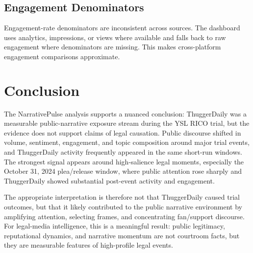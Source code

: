 \documentclass[12pt]{article}
\begin{document}
\subsection{Engagement Denominators}
Engagement-rate denominators are inconsistent across sources. The dashboard uses analytics, impressions, or views where available and falls back to raw engagement where denominators are missing. This makes cross-platform engagement comparisons approximate.

\section{Conclusion}
The NarrativePulse analysis supports a nuanced conclusion: ThuggerDaily was a measurable public-narrative exposure stream during the YSL RICO trial, but the evidence does not support claims of legal causation. Public discourse shifted in volume, sentiment, engagement, and topic composition around major trial events, and ThuggerDaily activity frequently appeared in the same short-run windows. The strongest signal appears around high-salience legal moments, especially the October 31, 2024 plea/release window, where public attention rose sharply and ThuggerDaily showed substantial post-event activity and engagement.

The appropriate interpretation is therefore not that ThuggerDaily caused trial outcomes, but that it likely contributed to the public narrative environment by amplifying attention, selecting frames, and concentrating fan/support discourse. For legal-media intelligence, this is a meaningful result: public legitimacy, reputational dynamics, and narrative momentum are not courtroom facts, but they are measurable features of high-profile legal events.

\newpage
\end{document}
